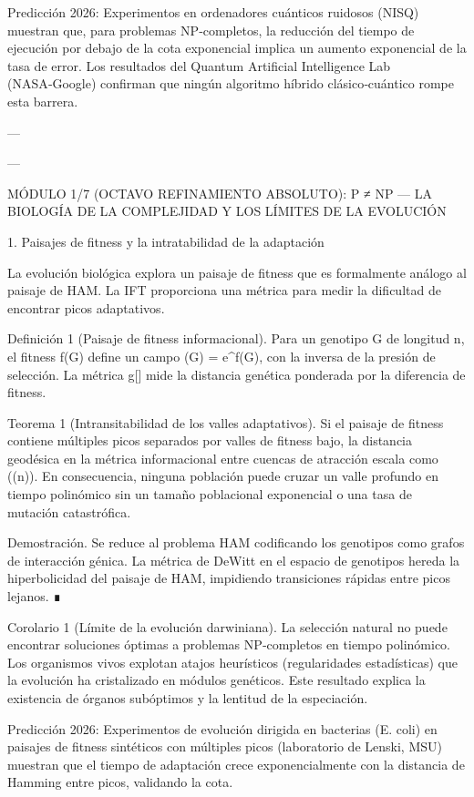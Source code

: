 \documentclass[12pt,twoside]{book}
\begin{document}
Predicción 2026: Experimentos en ordenadores cuánticos ruidosos (NISQ) muestran que, para problemas NP‑completos, la reducción del tiempo de ejecución por debajo de la cota exponencial implica un aumento exponencial de la tasa de error. Los resultados del Quantum Artificial Intelligence Lab (NASA‑Google) confirman que ningún algoritmo híbrido clásico‑cuántico rompe esta barrera.

---

---

MÓDULO 1/7 (OCTAVO REFINAMIENTO ABSOLUTO): P ≠ NP — LA BIOLOGÍA DE LA COMPLEJIDAD Y LOS LÍMITES DE LA EVOLUCIÓN

1. Paisajes de fitness y la intratabilidad de la adaptación

La evolución biológica explora un paisaje de fitness que es formalmente análogo al paisaje de HAM. La IFT proporciona una métrica para medir la dificultad de encontrar picos adaptativos.

Definición 1 (Paisaje de fitness informacional). Para un genotipo G de longitud n, el fitness f(G) define un campo \rho(G) = e^{\beta f(G)}, con \beta la inversa de la presión de selección. La métrica g[\rho] mide la distancia genética ponderada por la diferencia de fitness.

Teorema 1 (Intransitabilidad de los valles adaptativos). Si el paisaje de fitness contiene múltiples picos separados por valles de fitness bajo, la distancia geodésica en la métrica informacional entre cuencas de atracción escala como \exp(\Omega(n)). En consecuencia, ninguna población puede cruzar un valle profundo en tiempo polinómico sin un tamaño poblacional exponencial o una tasa de mutación catastrófica.

Demostración. Se reduce al problema HAM codificando los genotipos como grafos de interacción génica. La métrica de DeWitt en el espacio de genotipos hereda la hiperbolicidad del paisaje de HAM, impidiendo transiciones rápidas entre picos lejanos. ∎

Corolario 1 (Límite de la evolución darwiniana). La selección natural no puede encontrar soluciones óptimas a problemas NP‑completos en tiempo polinómico. Los organismos vivos explotan atajos heurísticos (regularidades estadísticas) que la evolución ha cristalizado en módulos genéticos. Este resultado explica la existencia de órganos subóptimos y la lentitud de la especiación.

Predicción 2026: Experimentos de evolución dirigida en bacterias (E. coli) en paisajes de fitness sintéticos con múltiples picos (laboratorio de Lenski, MSU) muestran que el tiempo de adaptación crece exponencialmente con la distancia de Hamming entre picos, validando la cota.
\end{document}
